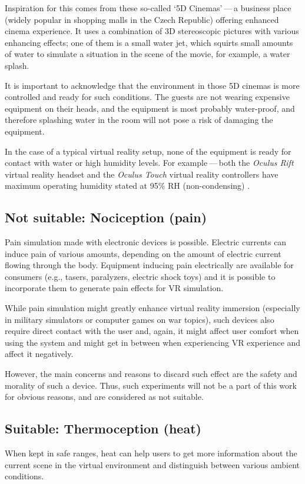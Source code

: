 Inspiration for this comes from these so-called `5D Cinemas' — a business
place (widely popular in shopping malls in the Czech Republic) offering
enhanced cinema experience. It uses a combination of 3D stereoscopic
pictures with various enhancing effects; one of them is a small water jet, 
which squirts small amounts of water to simulate a
situation in the scene of the movie, for example, a water splash. \cite{5dcin}


It is important to acknowledge that the environment in those 5D cinemas
is more controlled and ready for such conditions. The guests are not
wearing expensive equipment on their heads, and the equipment is
most probably water-proof, and therefore splashing water in the room will not
pose a risk of damaging the equipment.


In the case of a typical virtual reality setup, none of the equipment is ready
for contact with water or high humidity levels. For example — both the
\emph{Oculus Rift} virtual reality headset and the \emph{Oculus Touch} virtual reality
controllers have maximum operating humidity stated at 95\% RH (non-condensing)
. \cite{orhswg}


\hypertarget{x-not-suitable:-nociception-(pain)}{\subsection{Not suitable: Nociception (pain)}}
Pain simulation made with electronic devices is possible. Electric currents can
induce pain of various amounts, depending on the amount of electric current
flowing through the body.
Equipment inducing pain electrically are available for consumers
(e.g., tasers, paralyzers, electric shock toys) and it is possible to
incorporate them to generate pain effects for VR simulation.


While pain simulation might greatly enhance virtual reality immersion
(especially in military simulators or computer games on war topics),
such devices also require direct contact with the user and, again,
it might affect user comfort when using the system and might get in between
when experiencing VR experience and affect it negatively.


However, the main concerns and reasons to discard such effect are the
safety and morality of such a device. Thus, such experiments will not be
a part of this work for obvious reasons, and are considered as not suitable.


\hypertarget{x-suitable:-thermoception-(heat)}{\subsection{Suitable: Thermoception (heat)}}
When kept in safe ranges, heat can help users to get more information about the
current scene in the virtual environment and distinguish between 
various ambient conditions.

